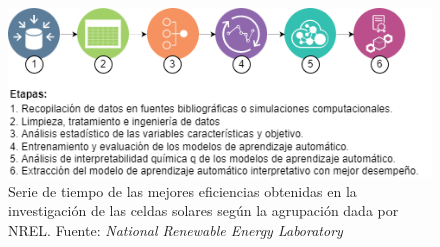 \begin{figure}[h!]
    \begin{center}
        \includegraphics[scale=0.7]{img/etapas.png}
    \end{center}
    \label{img:etapas}
    \caption{Serie de tiempo de las mejores eficiencias obtenidas en la investigación de las celdas solares según la agrupación dada por NREL.
    Fuente: \textit{National Renewable Energy Laboratory} \cite{owidenergy}}
\end{figure}
